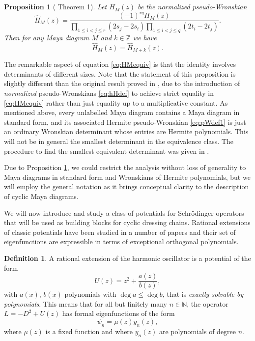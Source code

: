 \documentclass[10pt]{amsart}
\newtheorem{prop}[thm]{Proposition}
\theoremstyle{definition}
\newtheorem{definition}[thm]{Definition}
\numberwithin{equation}{section}
\numberwithin{figure}{section}
\newcommand{\Z}{\mathbb{Z}}
\renewcommand{\H}{H}%
\newcommand{\cL}{L}%
\begin{document}
\begin{prop}[\cite{gomez2016durfee} Theorem 1]\label{prop:equiv}
  Let  $\widehat{\H}_M(z)$ be the normalized pseudo-Wronskian
  \begin{equation}
    \label{eq:hHdef}
    \widehat{\H}_M(z) = \frac{(-1)^{rq}\H_M(z)}{\prod_{1\leq i<j\leq r} (2s_j-2s_i)\prod_{1\leq
        i<j\leq q}
      (2 t_i-2t_j)}.
  \end{equation}
Then for any Maya diagram $M$ and $k\in\Z$ we have
  \begin{equation} \label{eq:HMequiv}
       \widehat{\H}_M(z) =  \widehat{\H}_{M+k}(z).
  \end{equation}
\end{prop}
The remarkable aspect of equation \eqref{eq:HMequiv} is that the identity involves determinants of different sizes. Note that the statement of this proposition is slightly different than the original result proved in \cite{gomez2016durfee}, due to the introduction of \textit{normalized} pseudo-Wronskians \eqref{eq:hHdef} to achieve strict equality in \eqref{eq:HMequiv} rather than just equality up to a multiplicative constant.
As mentioned above, every unlabelled Maya diagram contains a Maya diagram in standard form, and its associated Hermite pseudo-Wronskian \eqref{eq:pWdef1} is just an ordinary Wronskian determinant whose entries are Hermite polynomials. This will not be in general the smallest determinant in the equivalence class. The procedure to find the smallest equivalent determinant was given in \cite{gomez2016durfee}. 

Due to Proposition \ref{prop:equiv}, we could restrict the analysis without loss of generality to Maya diagrams in standard form and Wronskians of Hermite polynomials, but we will employ the general notation as it 
brings conceptual clarity to the description of cyclic Maya diagrams.

We will now introduce and study a class of potentials for
Schr\"{o}dinger operators that will be used as building blocks for
cyclic dressing chains.  Rational extensions of classic potentials
have been studied in a number of papers \cite{grandati2012multistep,grandati2011solvable, odake2013extensions,marquette2013two,bagchi2015rational} and their set of eigenfunctions are expressible in terms of exceptional orthogonal polynomials.

\begin{definition}
A rational extension of the harmonic
oscillator is a potential of the form
\[ U(z) = z^2 + \frac{a(z)}{b(z)},\] 
with  $a(x)$, $b(x)$  polynomials with $\deg a\leq \deg b$,
that is \textit{exactly solvable by polynomials}.  This means that for
all but finitely many $n\in\mathbb N$, the operator $\cL=-D^2+U(z)$ has
formal eigenfunctions of the form
\[ \psi_n = \mu(z) y_n(z),\]
where $\mu(z)$ is a fixed function and where $y_n(z)$ are polynomials
of degree $n$.
\end{definition}
\end{document}
